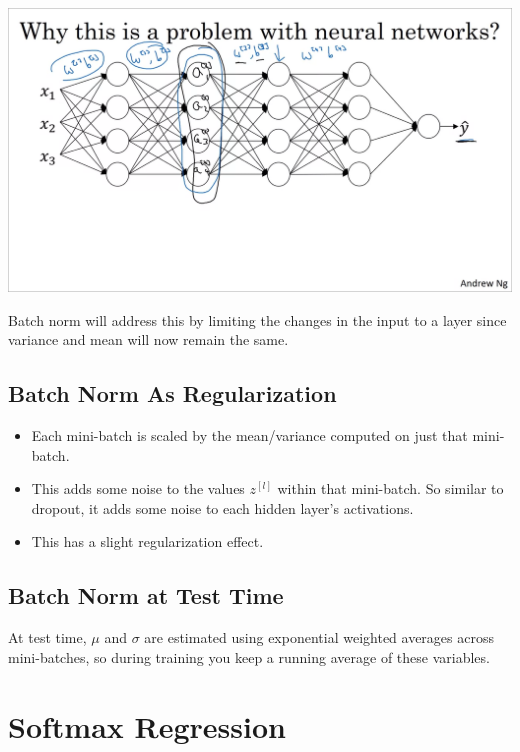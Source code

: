 \includegraphics[width=\linewidth]{images/nn_covariate_shift.png}

Batch norm will address this by limiting the changes in the input to a layer since variance and mean will now remain the same.

\subsection*{Batch Norm As Regularization}

\begin{itemize}
    \item Each mini-batch is scaled by the mean/variance computed on just that mini-batch.
    \item This adds some noise to the values $z^{[l]}$ within that mini-batch. So similar to dropout, it adds some noise to each hidden layer's activations.
    \item This has a slight regularization effect.
\end{itemize}

\subsection*{Batch Norm at Test Time}

At test time, $\mu$ and $\sigma$ are estimated using exponential weighted averages across mini-batches, 
so during training you keep a running average of these variables.




\section{Softmax Regression}

